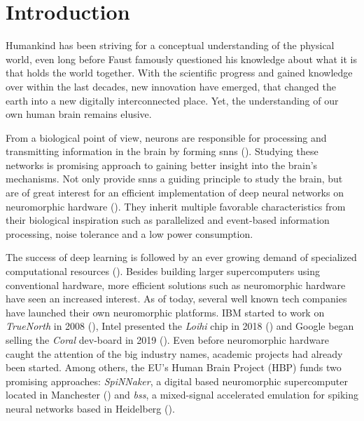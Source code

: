 \chapter{Introduction}


Humankind has been striving for a conceptual understanding of the physical world, even long before Faust famously questioned his knowledge about what it is that holds the world together. With the scientific progress and gained knowledge over within the last decades, new innovation have emerged, that changed the earth into a new digitally interconnected place. Yet, the understanding of our own human brain remains elusive.

From a biological point of view, neurons are responsible for processing and transmitting information in the brain by forming \glspl{snn} (\citealp{gerstner2014dynamics}). Studying these networks is promising approach to gaining better insight into the brain's mechanisms. Not only provide \glspl{snn} a guiding principle to study the brain, but are of great interest for an efficient implementation of deep neural networks on neuromorphic hardware (\citealp{pfeiffer2018deep}). They inherit multiple favorable characteristics from their biological inspiration such as parallelized and event-based information processing, noise tolerance and a low power consumption.

The success of deep learning is followed by an ever growing demand of specialized computational resources (\citealp{mayer2020scalable}). Besides building larger supercomputers using conventional hardware, more efficient solutions such as neuromorphic hardware have seen an increased interest. As of today, several well known tech companies have launched their own neuromorphic platforms. IBM started to work on \emph{TrueNorth} in 2008 (\citealp{akopyan2015truenorth}), Intel presented the \emph{Loihi} chip in 2018 (\citealp{davies2018loihi}) and Google began selling the \emph{Coral} dev-board in 2019 (\citealp{cass2019taking}). Even before neuromorphic hardware caught the attention of the big industry names, academic projects had already been started. Among others, the EU's Human Brain Project (HBP) funds two promising approaches: \emph{SpiNNaker}, a digital based neuromorphic supercomputer located in Manchester (\citealp{furber2014spinnaker}) and \emph{\gls{bss}}, a mixed-signal accelerated emulation for spiking neural networks based in Heidelberg (\citealp{brainscales_webpublic}).

